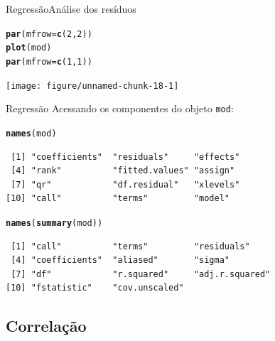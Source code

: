 \documentclass[10pt]{beamer}\usepackage[]{graphicx}\usepackage[]{color}
\makeatletter
\newcommand{\hlnum}[1]{\textcolor[rgb]{0.686,0.059,0.569}{#1}}%
\newcommand{\hlstd}[1]{\textcolor[rgb]{0.345,0.345,0.345}{#1}}%
\newcommand{\hlkwc}[1]{\textcolor[rgb]{0.333,0.667,0.333}{#1}}%
\newcommand{\hlkwd}[1]{\textcolor[rgb]{0.737,0.353,0.396}{\textbf{#1}}}%
\newenvironment{kframe}{%
 \def\at@end@of@kframe{}%
 \ifinner\ifhmode%
  \def\at@end@of@kframe{\end{minipage}}%
  \begin{minipage}{\columnwidth}%
 \fi\fi%
 \def\FrameCommand##1{\hskip\@totalleftmargin \hskip-\fboxsep
 \colorbox{shadecolor}{##1}\hskip-\fboxsep
     \hskip-\linewidth \hskip-\@totalleftmargin \hskip\columnwidth}%
 \MakeFramed {\advance\hsize-\width
   \@totalleftmargin\z@ \linewidth\hsize
   \@setminipage}}%
 {\par\unskip\endMakeFramed%
 \at@end@of@kframe}
\newenvironment{knitrout}{}{} %
\theoremstyle{definition}
\makeatother
\begin{document}
\begin{frame}[fragile=singleslide]{Regressão}{Análise dos resíduos}
\begin{knitrout}\small
{}\color{fgcolor}\begin{kframe}
\begin{alltt}
\hlkwd{par}\hlstd{(}\hlkwc{mfrow} \hlstd{=} \hlkwd{c}\hlstd{(}\hlnum{2}\hlstd{,}\hlnum{2}\hlstd{))}
\hlkwd{plot}\hlstd{(mod)}
\hlkwd{par}\hlstd{(}\hlkwc{mfrow} \hlstd{=} \hlkwd{c}\hlstd{(}\hlnum{1}\hlstd{,}\hlnum{1}\hlstd{))}
\end{alltt}
\end{kframe}

{\centering \texttt{[image: figure/unnamed-chunk-18-1]} 

}



\end{knitrout}
\end{frame}

\begin{frame}[fragile=singleslide]{Regressão}
Acessando os componentes do objeto \texttt{mod}:
\begin{knitrout}\small
{}\color{fgcolor}\begin{kframe}
\begin{alltt}
\hlkwd{names}\hlstd{(mod)}
\end{alltt}
\begin{verbatim}
 [1] "coefficients"  "residuals"     "effects"      
 [4] "rank"          "fitted.values" "assign"       
 [7] "qr"            "df.residual"   "xlevels"      
[10] "call"          "terms"         "model"        
\end{verbatim}
\begin{alltt}
\hlkwd{names}\hlstd{(}\hlkwd{summary}\hlstd{(mod))}
\end{alltt}
\begin{verbatim}
 [1] "call"          "terms"         "residuals"    
 [4] "coefficients"  "aliased"       "sigma"        
 [7] "df"            "r.squared"     "adj.r.squared"
[10] "fstatistic"    "cov.unscaled" 
\end{verbatim}
\end{kframe}
\end{knitrout}
\end{frame}

\subsection{Correlação}
\end{document}
